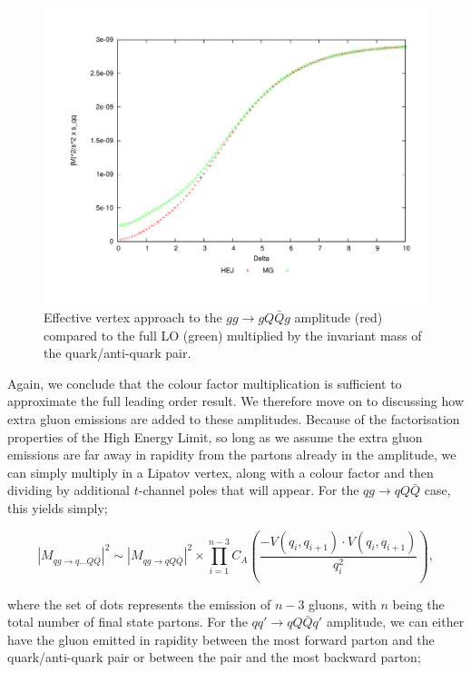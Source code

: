 \begin{figure}[H]
\centering
\includegraphics[scale=0.47]{Images/gg_gqqxg_sqq_simplecf.pdf}
\caption{Effective vertex approach to the $gg \to gQ\bar{Q}g$ amplitude (red) compared to the full LO (green) multiplied by the invariant mass of the quark/anti-quark pair.}
\label{fig:gg_gqqg}
\end{figure}

Again, we conclude that the colour factor multiplication is sufficient to approximate the full leading order result. We therefore move on to discussing how extra gluon emissions are added to these amplitudes. Because of the factorisation properties of the High Energy Limit, so long as we assume the extra gluon emissions are far away in rapidity from the partons already in the amplitude, we can simply multiply in a Lipatov vertex, along with a colour factor and then dividing by additional $t$-channel poles that will appear. For the $qg \to qQ\bar{Q}$ case, this yields simply;

\begin{equation}
|M_{qg \to q...Q\bar{Q}}|^2 \sim |M_{qg \to qQ\bar{Q}}|^2 \times \prod_{i=1}^{n-3}  C_A \left(\frac{-V(q_i,q_{i+1}) \cdot V(q_i,q_{i+1})}{q_i^2} \right),
\end{equation}

where the set of dots represents the emission of $n-3$ gluons, with $n$ being the total number of final state partons. For the $qq' \to qQ\bar{Q}q'$ amplitude, we can either have the gluon emitted in rapidity between the most forward parton and the quark/anti-quark pair or between the pair and the most backward parton;

